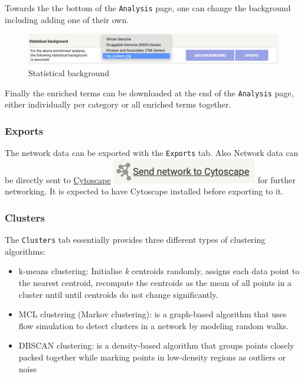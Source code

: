 \documentclass[
]{book}
\begin{document}
Towards the the bottom of the \texttt{Analysis} page, one can change the background including adding one of their own.

\begin{figure}

{\centering \includegraphics[width=1\linewidth]{images/string-statistical-background} 

}

\caption{Statistical background}\label{fig:unnamed-chunk-21}
\end{figure}

Finally the enriched terms can be downloaded at the end of the \texttt{Analysis} page, either individually per category or all enriched terms together.

\hypertarget{exports}{%
\subsubsection{Exports}\label{exports}}

The network data can be exported with the \texttt{Exports} tab. Also Network data can be directly sent to \href{https://cytoscape.org/}{Cytoscape} \includegraphics{images/network-to-Cytoscape.png} for further networking. It is expected to have Cytoscape installed before exporting to it.

\hypertarget{clusters}{%
\subsubsection{Clusters}\label{clusters}}

The \texttt{Clusters} tab essentially provides three different types of clustering algorithms:

\begin{itemize}
\item
  k-means clustering: Initialise \emph{k} centroids randomly, assigns each data point to the nearest centroid, recompute the centroids as the mean of all points in a cluster until until centroids do not change significantly.
\item
  MCL clustering (Markov clustering): is a graph-based algorithm that uses flow simulation to detect clusters in a network by modeling random walks.
\item
  DBSCAN clustering: is a density-based algorithm that groups points closely packed together while marking points in low-density regions as outliers or noise
\end{itemize}
\end{document}

